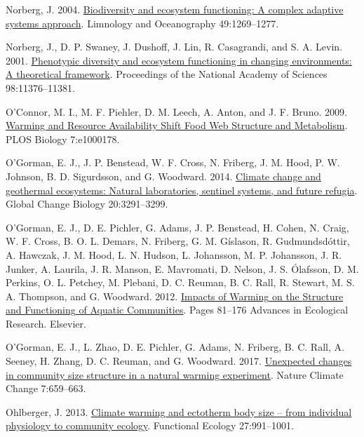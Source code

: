 \documentclass[
]{article}
\newlength{\cslhangindent}
\newlength{\cslentryspacingunit} %
\newenvironment{CSLReferences}[2] %
 {%
  \setlength{\parindent}{0pt}
  \ifodd #1
  \let\oldpar\par
  \def\par{\hangindent=\cslhangindent\oldpar}
  \fi
  \setlength{\parskip}{#2\cslentryspacingunit}
 }%
 {}
\numberwithin{equation}
\begin{document}
\begin{CSLReferences}{1}{0}
\leavevmode{}%
Norberg, J. 2004.
\href{https://doi.org/10.4319/lo.2004.49.4_part_2.1269}{Biodiversity and
ecosystem functioning: {A} complex adaptive systems approach}. Limnology
and Oceanography 49:1269--1277.

\leavevmode{}%
Norberg, J., D. P. Swaney, J. Dushoff, J. Lin, R. Casagrandi, and S. A.
Levin. 2001. \href{https://doi.org/10.1073/pnas.171315998}{Phenotypic
diversity and ecosystem functioning in changing environments: {A}
theoretical framework}. Proceedings of the National Academy of Sciences
98:11376--11381.

\leavevmode{}%
O'Connor, M. I., M. F. Piehler, D. M. Leech, A. Anton, and J. F. Bruno.
2009. \href{https://doi.org/10.1371/journal.pbio.1000178}{Warming and
{Resource Availability Shift Food Web Structure} and {Metabolism}}. PLOS
Biology 7:e1000178.

\leavevmode{}%
O'Gorman, E. J., J. P. Benstead, W. F. Cross, N. Friberg, J. M. Hood, P.
W. Johnson, B. D. Sigurdsson, and G. Woodward. 2014.
\href{https://doi.org/10.1111/gcb.12602}{Climate change and geothermal
ecosystems: Natural laboratories, sentinel systems, and future refugia}.
Global Change Biology 20:3291--3299.

\leavevmode{}%
O'Gorman, E. J., D. E. Pichler, G. Adams, J. P. Benstead, H. Cohen, N.
Craig, W. F. Cross, B. O. L. Demars, N. Friberg, G. M. Gíslason, R.
Gudmundsdóttir, A. Hawczak, J. M. Hood, L. N. Hudson, L. Johansson, M.
P. Johansson, J. R. Junker, A. Laurila, J. R. Manson, E. Mavromati, D.
Nelson, J. S. Ólafsson, D. M. Perkins, O. L. Petchey, M. Plebani, D. C.
Reuman, B. C. Rall, R. Stewart, M. S. A. Thompson, and G. Woodward.
2012. \href{https://doi.org/10.1016/B978-0-12-398315-2.00002-8}{Impacts
of {Warming} on the {Structure} and {Functioning} of {Aquatic
Communities}}. Pages 81--176 Advances in {Ecological Research}.
Elsevier.

\leavevmode{}%
O'Gorman, E. J., L. Zhao, D. E. Pichler, G. Adams, N. Friberg, B. C.
Rall, A. Seeney, H. Zhang, D. C. Reuman, and G. Woodward. 2017.
\href{https://doi.org/10.1038/nclimate3368}{Unexpected changes in
community size structure in a natural warming experiment}. Nature
Climate Change 7:659--663.

\leavevmode{}%
Ohlberger, J. 2013.
\href{https://doi.org/10.1111/1365-2435.12098}{Climate warming and
ectotherm body size -- from individual physiology to community ecology}.
Functional Ecology 27:991--1001.


\end{CSLReferences}
\end{document}

